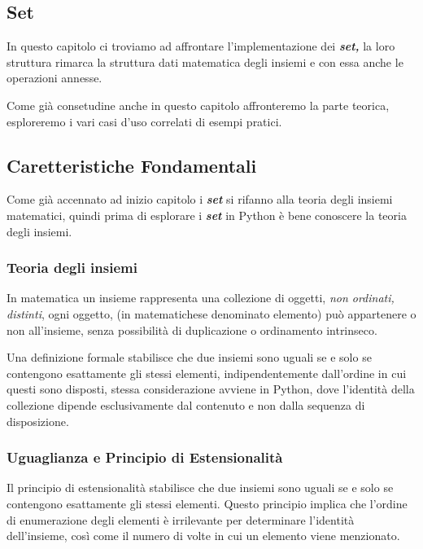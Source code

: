 \subsection{Set}

In questo capitolo ci troviamo ad affrontare l'implementazione dei \textit{\textbf{set,}} la loro struttura rimarca la struttura dati matematica degli insiemi e con essa anche le operazioni annesse.

Come già consetudine anche in questo capitolo affronteremo la parte teorica, esploreremo i vari casi d'uso correlati di esempi pratici.

\subsection{Caretteristiche Fondamentali}\label{fondamentsSet}
Come già accennato ad inizio capitolo i \textit{\textbf{set}} si rifanno alla teoria degli insiemi matematici, quindi prima di esplorare i \textit{\textbf{set}} in Python è bene conoscere la teoria degli insiemi.

\subsubsection{Teoria degli insiemi}\label{TeoriadegliInsiemi}

In matematica un insieme rappresenta una collezione di oggetti, \textit{non ordinati, distinti}, ogni oggetto, (in matematichese denominato elemento) può appartenere o non all'insieme, senza possibilità di duplicazione o ordinamento intrinseco.

Una definizione formale stabilisce che due insiemi sono uguali se e solo se contengono esattamente gli stessi elementi, indipendentemente dall'ordine in cui questi sono disposti, stessa considerazione avviene in Python, dove l'identità della collezione dipende esclusivamente dal contenuto e non dalla sequenza di disposizione.

\subsubsection{Uguaglianza e Principio di Estensionalità}\label{EstensionalitàSet}

Il principio di estensionalità stabilisce che due insiemi sono uguali se e solo se contengono esattamente gli stessi elementi. Questo principio implica che l'ordine di enumerazione degli elementi è irrilevante per determinare l'identità dell'insieme, così come il numero di volte in cui un elemento viene menzionato. 


